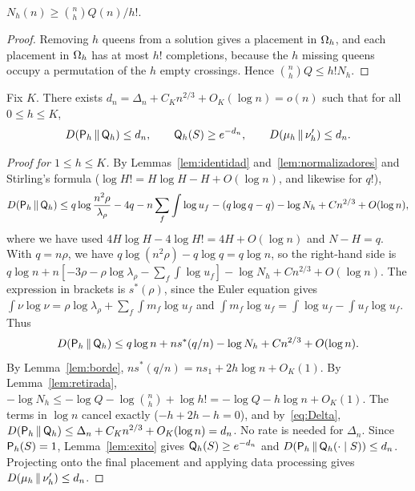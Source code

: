 \begin{lema}\label{lem:retirada}
$N_h(n)\ge\binom nh Q(n)/h!$.
\end{lema}

\begin{proof} Removing $h$ queens from a solution gives a placement in $\Omega_h$, and each placement in
$\Omega_h$ has at most $h!$
completions, because the $h$ missing queens occupy a permutation of the $h$ empty crossings. Hence
$\binom nhQ\le h!N_h$. \end{proof}

\begin{teorema}\label{thm:comparacion} Fix $K$. There exists
$d_n=\Delta_n+C_Kn^{2/3}+O_K(\log n)=o(n)$ such that
for all $0\le h\le K$, \[
 D(\mathsf{P}_h\,\Vert\,\mathsf{Q}_h)\le d_n,\qquad \mathsf{Q}_h(S)\ge e^{-d_n},\qquad D(\mu_h\,\Vert\,\nu'_h)\le d_n .
\] \end{teorema}

\begin{proof}[Proof for $1\le h\le K$] By Lemmas~\ref{lem:identidad} and~\ref{lem:normalizadores} and
Stirling's formula ($\log
H!=H\log H-H+O(\log n)$, and likewise for $q!$), \[
 D(\mathsf{P}_h\,\Vert\,\mathsf{Q}_h)\le q\log\frac{n^2\rho}{\lambda_\rho}-4q-n\sum_f\int\log u_f-(q\log q-q)
 -\log N_h+Cn^{2/3}+O(\log n),
\] where we have used $4H\log H-4\log H!=4H+O(\log n)$ and $N-H=q$. With $q=n\rho$, we have
$q\log(n^2\rho)-q\log q=q\log n$, so the
right-hand side is $q\log n+n[-3\rho-\rho\log\lambda_\rho-\sum_f\int\log u_f]-\log N_h+Cn^{2/3}+O(\log n)$.
The expression in brackets
is $s^*(\rho)$, since the Euler equation gives $\int\nu\log\nu=\rho\log\lambda_\rho+\sum_f\int m_f\log u_f$
and $\int m_f\log
u_f=\int\log u_f-\int u_f\log u_f$. Thus \[
 D(\mathsf{P}_h\,\Vert\,\mathsf{Q}_h)\le q\log n+ns^*(q/n)-\log N_h+Cn^{2/3}+O(\log n).
\] By Lemma~\ref{lem:borde}, $ns^*(q/n)=ns_1+2h\log n+O_K(1)$. By Lemma~\ref{lem:retirada},
$-\log N_h\le-\log Q-\log\binom nh+\log
h!=-\log Q-h\log n+O_K(1)$. The terms in $\log n$ cancel exactly ($-h+2h-h=0$), and by~\eqref{eq:Delta},
$D(\mathsf{P}_h\,\Vert\,\mathsf{Q}_h)\le\Delta_n+C_Kn^{2/3}+O_K(\log n)=d_n$. No rate is needed for $\Delta_n$. Since
$\mathsf{P}_h(S)=1$, Lemma~\ref{lem:exito}
gives $\mathsf{Q}_h(S)\ge e^{-d_n}$ and $D(\mathsf{P}_h\,\Vert\,\mathsf{Q}_h(\cdot\mid S))\le d_n$. Projecting onto the final
placement and applying data
processing gives $D(\mu_h\,\Vert\,\nu'_h)\le d_n$. \end{proof}
